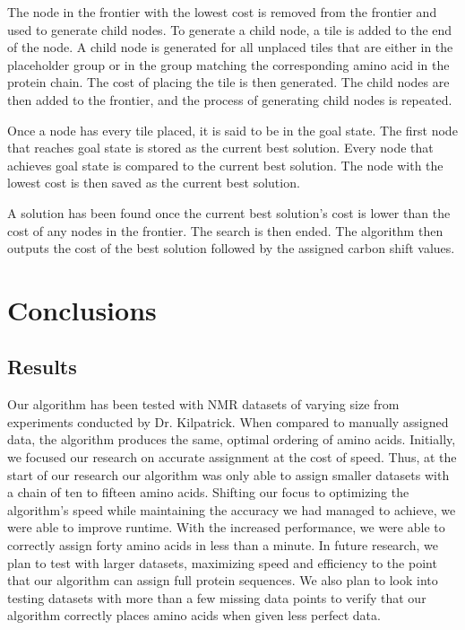 \documentclass[12pt, letter]{article}
\begin{document}
The node in the frontier with the lowest cost is removed from the frontier and used to generate child nodes. To generate a child node, a tile is added to the end of the node. A child node is generated for all unplaced tiles that are either in the placeholder group or in the group matching the corresponding amino acid in the protein chain. The cost of placing the tile is then generated.  The child nodes are then added to the frontier, and the process of generating child nodes is repeated. 

Once a node has every tile placed, it is said to be in the goal state. The first node that reaches goal state is stored as the current best solution. Every node that achieves goal state is compared to the current best solution. The node with the lowest cost is then saved as the current best solution. 

A solution has been found once the current best solution's cost is lower than the cost of any nodes in the frontier. The search is then ended. The algorithm then outputs the cost of the best solution followed by the assigned carbon shift values. 

\section{Conclusions}
\label{sec:conclusions}

\subsection{Results}
\label{sub:results}
Our algorithm has been tested with NMR datasets of varying size from experiments conducted by Dr. Kilpatrick.  When compared to manually assigned data, the algorithm produces the same, optimal ordering of amino acids. Initially, we focused our research on accurate assignment at the cost of speed. Thus, at the start of our research our algorithm was only able to assign smaller datasets with a chain of ten to fifteen amino acids. Shifting our focus to optimizing the algorithm's speed while maintaining the accuracy we had managed to achieve, we were able to improve runtime. With the increased performance, we were able to correctly assign forty amino acids in less than a minute. In future research, we plan to test with larger datasets, maximizing speed and efficiency to the point that our algorithm can assign full protein sequences. We also plan to look into testing datasets with more than a few missing data points to verify that our algorithm correctly places amino acids when given less perfect data.  
\end{document}
